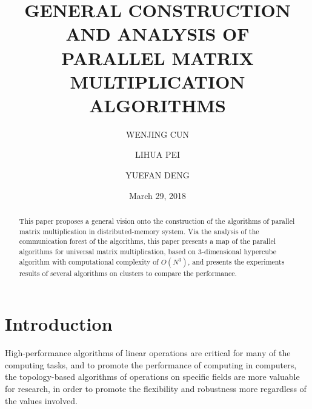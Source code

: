 \documentclass{amsart}
\theoremstyle{definition}
\theoremstyle{remark}
\numberwithin{equation}{section}
\begin{document}
\title{GENERAL CONSTRUCTION AND ANALYSIS OF \\ PARALLEL MATRIX MULTIPLICATION ALGORITHMS}

\author{WENJING CUN}
\address{Department of Applied Mathematics, Stonybrook Univ. SUNY, 
Stony Brook, New York 11790}

\author{LIHUA PEI}
\address{Department of Applied Mathematics, Stonybrook Univ. SUNY, 
Stony Brook, New York 11790}

\author{YUEFAN DENG}
\address{Department of Applied Mathematics, Stonybrook Univ. SUNY, 
Stony Brook, New York 11790}


\date{March 29, 2018}

\begin{abstract}
	This paper proposes a general vision onto the construction of the algorithms of parallel matrix multiplication in distributed-memory system. Via the analysis of the communication forest of the algorithms, this paper presents a map of the parallel algorithms for universal matrix multiplication, based on 3-dimensional hypercube algorithm with computational complexity of $O(N^3)$, and presents the experiments results of several algorithms on clusters to compare the performance.
\end{abstract}
\maketitle
\section{Introduction}
	High-performance algorithms of linear operations are critical for many of the computing tasks, and to promote the performance of computing in computers, the topology-based algorithms of operations on specific fields are more valuable for research, in order to promote the flexibility and robustness more regardless of the values involved.\par
\end{document}
